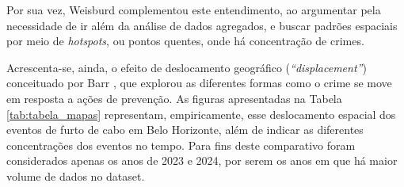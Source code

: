 Por sua vez, Weisburd \cite{Weisburd2015} complementou este entendimento, ao argumentar pela necessidade de ir além da análise de dados agregados, e buscar padrões espaciais por meio de \textit{hotspots}, ou pontos quentes, onde há concentração de crimes.

Acrescenta-se, ainda, o efeito de deslocamento geográfico (\textit{``displacement''}) conceituado por Barr \cite{Barr1990}, que explorou as diferentes formas como o crime se move em resposta a ações de prevenção. As figuras apresentadas na Tabela \ref{tab:tabela_mapas} representam, empiricamente, esse deslocamento espacial dos eventos de furto de cabo em Belo Horizonte, além de indicar as diferentes concentrações dos eventos no tempo. Para fins deste comparativo foram considerados apenas os anos de 2023 e 2024, por serem os anos em que há maior volume de dados no dataset.

